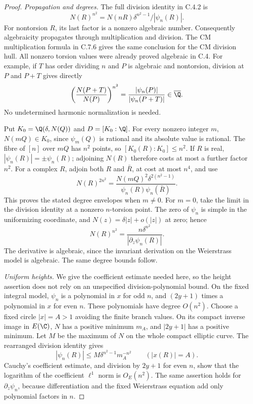 \begin{proof}
\emph{Propagation and degrees.}
The full division identity in C.4.2 is
\[
 N(R)^{n^2}=N(nR)\delta^{n^2-1}/|\psi_n(R)|.
\]
For nontorsion $R$, its last factor is a nonzero algebraic number.
Consequently algebraicity propagates through multiplication
and division.  The CM multiplication formula in C.7.6 gives
the same conclusion for the CM division hull.  All nonzero
torsion values were already proved algebraic in C.4.
For example, if $T$ has order dividing $n$ and $P$ is algebraic
and nontorsion, division at $P$ and $P+T$ gives directly
\[
 \left(\frac{N(P+T)}{N(P)}\right)^{n^2}
       =\frac{|\psi_n(P)|}{|\psi_n(P+T)|}\in\overline\Q.
\]
No undetermined harmonic normalization is needed.

Put $K_0=\Q(\delta,N(Q))$ and $D=[K_0:\Q]$.
For every nonzero integer $m$, $N(mQ)\in K_0$, since
$\psi_m(Q)$ is rational and its absolute value is rational.
The fibre of $[n]$ over $mQ$ has $n^2$ points, so
$[K_0(R):K_0]\leq n^2$.
If $R$ is real, $|\psi_n(R)|=\pm\psi_n(R)$; adjoining
$N(R)$ therefore costs at most a further factor $n^2$.
For a complex $R$, adjoin both $R$ and $\bar R$, at cost
at most $n^4$, and use
\[
 N(R)^{2n^2}=
 \frac{N(mQ)^2\delta^{2(n^2-1)}}
      {\psi_n(R)\psi_n(\bar R)}.
\]
This proves the stated degree envelopes when $m\ne0$.
For $m=0$, take the limit in the division identity at a nonzero
$n$-torsion point.  The zero of $\psi_n$ is simple in the
uniformizing coordinate, and $N(z)=\delta|z|+o(|z|)$ at zero;
hence
\[
 N(R)^{n^2}=
       \frac{n\delta^{n^2}}{|\partial_z\psi_n(R)|}.
\]
The derivative is algebraic, since the invariant derivation on
the Weierstrass model is algebraic.  The same degree bounds follow.

\emph{Uniform heights.}
We give the coefficient estimate needed here, so the height
assertion does not rely on an unspecified division-polynomial
bound.  On the fixed integral model, $\psi_n$ is a polynomial
in $x$ for odd $n$, and $(2y+1)$ times a polynomial in $x$
for even $n$.  These polynomials have degree $O(n^2)$.
Choose a fixed circle $|x|=A>1$ avoiding the finite branch values.
On its compact inverse image in $E(\C)$, $N$ has a positive
minimum $m_A$, and $|2y+1|$ has a positive minimum.  Let $M$
be the maximum of $N$ on the whole compact elliptic curve.
The rearranged division identity gives
\[
 |\psi_n(R)|\leq M\delta^{n^2-1}m_A^{-n^2}
       \qquad(|x(R)|=A).
\]
Cauchy's coefficient estimate, and division by $2y+1$ for
even $n$, show that the logarithm of the coefficient
$\ell^1$ norm is $O_E(n^2)$.  The same assertion holds for
$\partial_z\psi_n$, because differentiation and the fixed
Weierstrass equation add only polynomial factors in $n$.


\end{proof}
